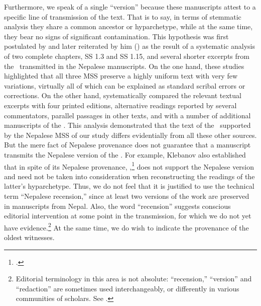 Furthermore, we speak of a single “version” because these manuscripts attest
to a specific line of transmission of the text.  That is to say, in terms of
stemmatic analysis they share a common ancestor or hyparchetype, while at
the same time, they bear no signs of significant contamination.  This
hypothesis was first postulated by \citet{kleb-2010} and later reiterated by
him () as the result of a systematic analysis of two
complete chapters, SS 1.3 and SS 1.15, and several shorter excerpts from the
\SS\ transmitted in the Nepalese manuscripts.  On the one hand, these
studies highlighted that all three MSS preserve a highly uniform text with
very few variations, virtually all of which can be explained as standard
scribal errors or corrections. On the other hand,
\citet{kleb-2010,kleb-2021a} systematically compared the relevant textual
excerpts with four printed editions, alternative readings reported by
several commentators, parallel passages in other texts, and with a number of
additional manuscripts of the \SS. This analysis demonstrated that the text
of the \SS\ supported by the Nepalese MSS of our study differs evidentially
from all these other sources. But the mere fact of Nepalese provenance does
not guarantee that a manuscript transmits the Nepalese version of the \SS.
For example, Klebanov also established that in spite of its Nepalese
provenance, ,\footcite{rima-2022} does not support
the Nepalese version and need not be taken into consideration when
reconstructing the readings of the latter's hyparchetype.  Thus, we do not
feel that it is justified to use the technical term “Nepalese recension,”
since at least two versions of the work are preserved in manuscripts from
Nepal.  Also, the word “recension” suggests conscious editorial intervention
at some point in the transmission, for which we do not yet have
evidence.\footnote{Editorial terminology in this area is not absolute:
    “recension,” “version” and “redaction” are sometimes used interchangeably,
    or differently in various communities of scholars. See
    \cite[164\,ff]{roel-2015}.} At the same time, we do wish to indicate the
    provenance of the oldest witnesses.

